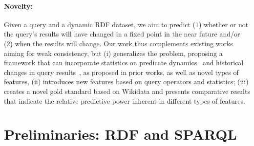 \documentclass[runningheads]{llncs}
\newcommand{\ah}[1]{{\color{blue}\textsc{ah:} #1}}
\begin{document}
\paragraph{Novelty:} Given a query and a dynamic RDF dataset, we aim to predict (1) whether or not the query's results will have changed in a fixed point in the near future and/or (2) when the results will change. Our work thus complements existing works aiming for weak consistency, but (i) generalizes the problem, proposing a framework that can incorporate statistics on predicate dynamics~\cite{UmbrichKHP12,UmbrichKPPH12,ekawUmbrichKHP12,DehghanzadehPKUHD14} and historical changes in query results~\cite{KnuthHS16}, as proposed in prior works, as well as novel types of features, (ii) introduces new features based on query operators and statistics; (iii) creates a novel gold standard based on Wikidata and presents comparative results that indicate the relative predictive power inherent in different types of features.


%
\section{Preliminaries: RDF and SPARQL}
\label{sec:preliminar}
\end{document}
